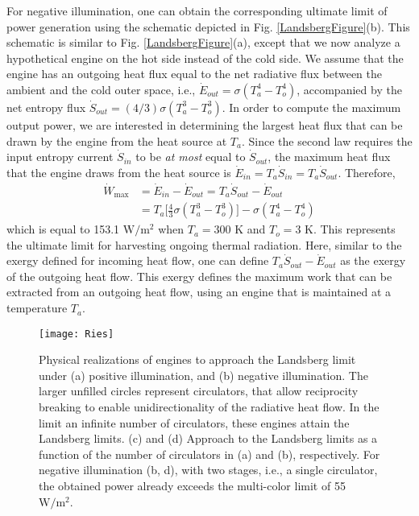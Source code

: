 \documentclass[notitlepage,onecolumn,aps,showpacs,preprintnumbers,amsmath,amssymb,superscriptaddress]{revtex4-1}
\begin{document}
For negative illumination, one can obtain the corresponding ultimate limit of power generation using the schematic depicted in Fig. \ref{LandsbergFigure}(b). This schematic is similar to Fig. \ref{LandsbergFigure}(a), except that we now analyze a hypothetical engine on the hot side instead of the cold side. We assume that the engine has an outgoing heat flux equal to the net radiative flux between the ambient and the cold outer space, i.e., $\dot{E}_{out} = \sigma(T_a^4-T_o^4)$, accompanied by the net entropy flux $\dot{S}_{out} = (4/3)\sigma(T_a^3-T_o^3)$. In order to compute the maximum output power, we are interested in determining the largest heat flux that can be drawn by the engine from the heat source at $T_a$. Since the second law requires the input entropy current $\dot{S}_{in}$ to be \textit{at most} equal to $\dot{S}_{out}$, the maximum heat flux that the engine draws from the heat source is $\dot{E}_{in}=T_a\dot{S}_{in}= T_a\dot{S}_{out}$. Therefore,
\begin{align}
\dot{W}_\textrm{max} &= \dot{E}_{in}-\dot{E}_{out} = T_a\dot{S}_{out} - \dot{E}_{out} \nonumber\\
&=T_a\Big[\frac{4}{3}\sigma(T_a^3-T_o^3)\Big]-\sigma(T_a^4-T_o^4) \label{compareries}
\end{align}
which is equal to 153.1 $\mathrm{W/m^2}$ when $T_a = 300$ K and $T_o = 3$ K. This represents the ultimate limit for harvesting ongoing thermal radiation. Here, similar to the exergy defined for incoming heat flow, one can define $T_a\dot{S}_{out} - \dot{E}_{out}$ as the exergy of the outgoing heat flow. This exergy defines the maximum work that can be extracted from an outgoing heat flow, using an engine that is maintained at a temperature $T_a$. \\
\begin{figure}
\centering
\hskip -0.2in
\texttt{[image: Ries]}
\caption{Physical realizations of engines to approach the Landsberg limit under (a) positive illumination, and (b) negative illumination. The larger unfilled circles represent circulators, that allow reciprocity breaking to enable unidirectionality of the radiative heat flow. In the limit an infinite number of circulators, these engines attain the Landsberg limits. (c) and (d) Approach to the Landsberg limits as a function of the number of circulators in (a) and (b), respectively. For negative illumination (b, d), with two stages, i.e., a single circulator, the obtained power already exceeds the multi-color limit of 55 $\mathrm{W/m^2}$.}
\label{RiesFigure}
\end{figure}
\end{document}
